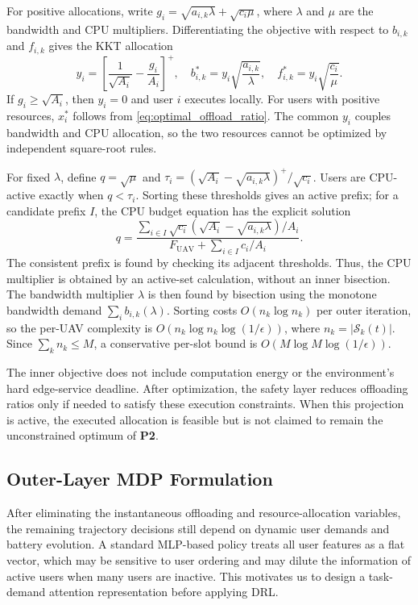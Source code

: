 \documentclass[journal]{IEEEtran}
\begin{document}
For positive allocations, write
$g_i=\sqrt{a_{i,k}\lambda}+\sqrt{c_i\mu}$, where $\lambda$ and $\mu$ are the
bandwidth and CPU multipliers. Differentiating the objective with respect to
$b_{i,k}$ and $f_{i,k}$ gives the KKT allocation
\begin{equation}\label{eq:joint_waterfill}
 y_i=\left[\frac{1}{\sqrt{A_i}}-\frac{g_i}{A_i}\right]^+,\quad
 b_{i,k}^*=y_i\sqrt{\frac{a_{i,k}}{\lambda}},\quad
 f_{i,k}^*=y_i\sqrt{\frac{c_i}{\mu}}.
\end{equation}
If $g_i\ge\sqrt{A_i}$, then $y_i=0$ and user $i$ executes locally. For users
with positive resources, $x_i^*$ follows from \eqref{eq:optimal_offload_ratio}.
The common $y_i$ couples bandwidth and CPU allocation, so the two resources
cannot be optimized by independent square-root rules.

For fixed $\lambda$, define $q=\sqrt{\mu}$ and
$\tau_i=(\sqrt{A_i}-\sqrt{a_{i,k}\lambda})^+/\sqrt{c_i}$. Users are
CPU-active exactly when $q<\tau_i$. Sorting these thresholds gives an active
prefix; for a candidate prefix $I$, the CPU budget equation has the explicit
solution
\[
q=\frac{\sum_{i\in I}\sqrt{c_i}(\sqrt{A_i}-\sqrt{a_{i,k}\lambda})/A_i}
{F_{\mathrm{UAV}}+\sum_{i\in I}c_i/A_i}.
\]
The consistent prefix is found by checking its adjacent thresholds. Thus,
the CPU multiplier is obtained by an active-set calculation, without an inner
bisection. The bandwidth multiplier $\lambda$ is then found by bisection
using the monotone bandwidth demand $\sum_i b_{i,k}(\lambda)$. Sorting costs
$O(n_k\log n_k)$ per outer iteration, so the per-UAV complexity is
$O(n_k\log n_k\log(1/\epsilon))$, where $n_k=|\mathcal{S}_k(t)|$. Since
$\sum_k n_k\le M$, a conservative per-slot bound is
$O(M\log M\log(1/\epsilon))$.

The inner objective does not include computation energy or the environment's
hard edge-service deadline. After optimization, the safety layer reduces
offloading ratios only if needed to satisfy these execution constraints.
When this projection is active, the executed allocation is feasible but is
not claimed to remain the unconstrained optimum of \textbf{P2}.
\subsection{Outer-Layer MDP Formulation}\label{subsec:mdp}

After eliminating the instantaneous offloading and resource-allocation
variables, the remaining trajectory decisions still depend on dynamic user demands and
battery evolution. A standard MLP-based policy treats all user features as a
flat vector, which may be sensitive to user ordering and may dilute the
information of active users when many users are inactive. This motivates us
to design a task-demand attention representation before applying DRL.
\end{document}
